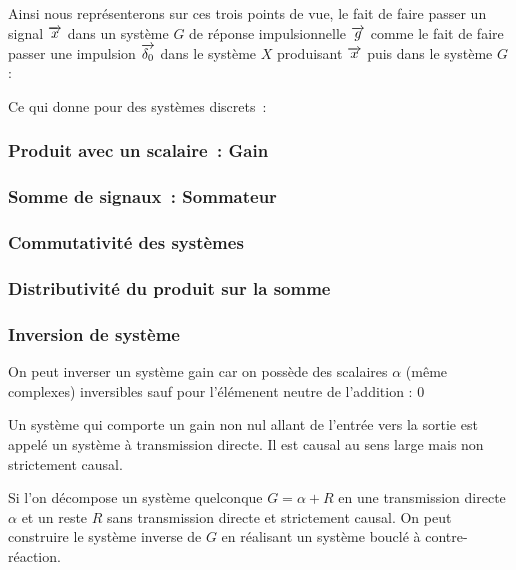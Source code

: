 Ainsi nous représenterons sur ces trois points de vue, le fait de
faire passer un signal $\overrightarrow{x}$ dans un système $G$ de réponse
impulsionnelle $\overrightarrow{g}$ comme le fait de faire passer une impulsion $\d0$
dans le système $X$ produisant $\overrightarrow{x}$ puis dans le système $G$ :


Ce qui donne pour des systèmes discrets~:


\subsubsection{Produit avec un scalaire~: Gain}

\subsubsection{Somme de signaux~: Sommateur}

\subsubsection{Commutativité des systèmes}


\subsubsection{Distributivité du produit sur la somme}


\subsubsection{Inversion de système}

On peut inverser un système gain car on possède des scalaires $\alpha$
(même complexes) inversibles sauf pour l'élémenent neutre de
l'addition : $0$

Un système qui comporte un gain non nul allant de l'entrée vers la
sortie est appelé un système à transmission directe. Il est causal au
sens large mais non strictement causal.


Si l'on décompose un système quelconque $G=\alpha+R$ en une
transmission directe $\alpha$ et un reste $R$ sans transmission
directe et strictement causal. On peut construire le système inverse
de $G$ en réalisant un système bouclé à contre-réaction.



